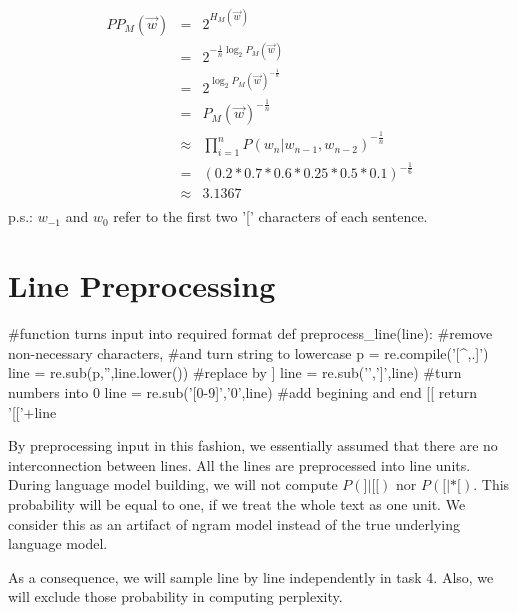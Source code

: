 \documentclass{article}
\begin{document}
	\begin{eqnarray*}
	PP_M(\vec{w}) &=& 2^{H_M(\vec{w})}  \\
	&=& 2^{-\frac{1}{n} \log_2 P_M(\vec{w}) }  \\
	&=& 2^{\log_2 P_M(\vec{w})^{-\frac{1}{n}}} \\
	&=& P_M(\vec{w})^{-\frac{1}{n}} \\
	&\approx& {\prod_{i=1}^{n} P(w_n|w_{n-1},w_{n-2})}^{-\frac{1}{n}} \\
	&=& (0.2*0.7*0.6*0.25*0.5*0.1)^{-\frac{1}{6}} \\
	&\approx& 3.1367 \nonumber \\
	\end{eqnarray*}
	p.s.: $w_{-1}$ and $w_0$ refer to the first two {'['} characters of each sentence.

\section{Line Preprocessing}

\begin{python}

#function turns input into required format
def preprocess_line(line):
    #remove non-necessary characters, 
    #and turn string to lowercase
    p = re.compile('[^\w\s,.]')
    line = re.sub(p,'',line.lower())
    #replace \n by ]
    line = re.sub('\n',']',line)
    #turn numbers into 0
    line = re.sub('[0-9]','0',line)
    #add begining and end [[
    return '[['+line
\end{python}
\label{indep}By preprocessing input in this fashion, we essentially assumed that there are no interconnection between lines. All the lines are preprocessed into line units. During language model building, we will not compute $P(]|[[)$ nor  $P([|*[)$. This probability will be equal to one, if we treat the whole text as one unit. We consider this as an artifact of ngram model instead of the true underlying language model.

As a consequence, we will sample line by line independently in task 4. Also, we will exclude those probability in computing perplexity.

\end{document}
